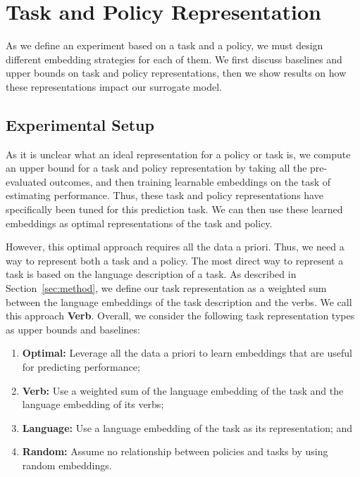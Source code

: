 
\section{Task and Policy Representation}
\label{sec:task_results}
As we define an experiment based on a task and a policy, we must design different embedding strategies for each of them.
We first discuss baselines and upper bounds on task and policy representations, then we show results on how these representations impact our surrogate model.

\subsection{Experimental Setup}
As it is unclear what an ideal representation for a policy or task is, we compute an upper bound for a task and policy representation by taking all the pre-evaluated outcomes, and then training learnable embeddings on the task of estimating performance. 
Thus, these task and policy representations have specifically been tuned for this prediction task.
We can then use these learned embeddings as optimal representations of the task and policy.

However, this optimal approach requires all the data a priori. 
Thus, we need a way to represent both a task and a policy.
The most direct way to represent a task is based on the language description of a task.
As described in Section~\ref{sec:method}, we define our task representation as a weighted sum between the language embeddings of the task description and the verbs.
We call this approach \textcolor{verb}{\textbf{Verb}}.
Overall, we consider the following task representation types as upper bounds and baselines:
\begin{enumerate}
    \item \textcolor{optimal}{\textbf{Optimal:}} Leverage all the data a priori to learn embeddings that are useful for predicting performance;
    \item \textcolor{verb}{\textbf{Verb:}} Use a weighted sum of the language embedding of the task and the language embedding of its verbs;
    \item \textcolor{lang}{\textbf{Language:}} Use a language embedding of the task as its representation; and
    \item \textcolor{random}{\textbf{Random:}} Assume no relationship between policies and tasks by using random embeddings.
\end{enumerate}



